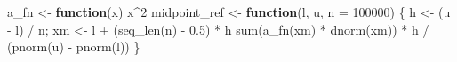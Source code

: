 \documentclass[
  letterpaper,
  DIV=11,
  numbers=noendperiod]{scrreprt}
\newenvironment{Shaded}{\begin{snugshade}}{\end{snugshade}}
\newcommand{\AttributeTok}[1]{\textcolor[rgb]{0.40,0.45,0.13}{#1}}
\newcommand{\ControlFlowTok}[1]{\textcolor[rgb]{0.00,0.23,0.31}{\textbf{#1}}}
\newcommand{\DecValTok}[1]{\textcolor[rgb]{0.68,0.00,0.00}{#1}}
\newcommand{\FloatTok}[1]{\textcolor[rgb]{0.68,0.00,0.00}{#1}}
\newcommand{\FunctionTok}[1]{\textcolor[rgb]{0.28,0.35,0.67}{#1}}
\newcommand{\NormalTok}[1]{\textcolor[rgb]{0.00,0.23,0.31}{#1}}
\newcommand{\OtherTok}[1]{\textcolor[rgb]{0.00,0.23,0.31}{#1}}
\newcommand{\SpecialCharTok}[1]{\textcolor[rgb]{0.37,0.37,0.37}{#1}}
\begin{document}
\begin{Shaded}
\begin{Highlighting}[]
\NormalTok{a\_fn }\OtherTok{\textless{}{-}} \ControlFlowTok{function}\NormalTok{(x) x}\SpecialCharTok{\^{}}\DecValTok{2}
\NormalTok{midpoint\_ref }\OtherTok{\textless{}{-}} \ControlFlowTok{function}\NormalTok{(l, u, }\AttributeTok{n =} \DecValTok{100000}\NormalTok{) \{}
\NormalTok{    h }\OtherTok{\textless{}{-}}\NormalTok{ (u }\SpecialCharTok{{-}}\NormalTok{ l) }\SpecialCharTok{/}\NormalTok{ n; xm }\OtherTok{\textless{}{-}}\NormalTok{ l }\SpecialCharTok{+}\NormalTok{ (}\FunctionTok{seq\_len}\NormalTok{(n) }\SpecialCharTok{{-}} \FloatTok{0.5}\NormalTok{) }\SpecialCharTok{*}\NormalTok{ h}
    \FunctionTok{sum}\NormalTok{(}\FunctionTok{a\_fn}\NormalTok{(xm) }\SpecialCharTok{*} \FunctionTok{dnorm}\NormalTok{(xm)) }\SpecialCharTok{*}\NormalTok{ h }\SpecialCharTok{/}\NormalTok{ (}\FunctionTok{pnorm}\NormalTok{(u) }\SpecialCharTok{{-}} \FunctionTok{pnorm}\NormalTok{(l))}
\NormalTok{\}}


\end{Highlighting}
\end{Shaded}
\end{document}
